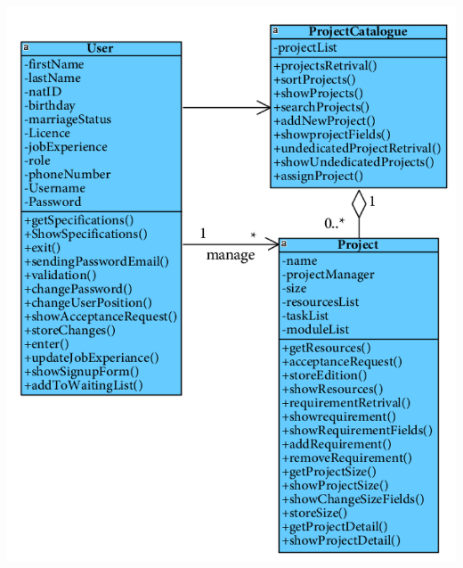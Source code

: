 \newpage
\vspace{2cm}
\begin{center}
\includegraphics[width=\textwidth]{SequenceClasses/37.png}
\end{center}

\newpage
\vspace{2cm}
